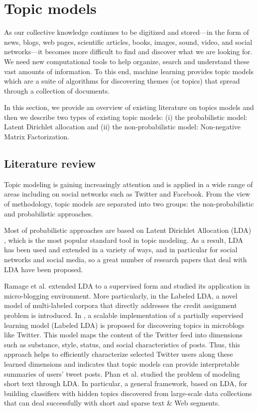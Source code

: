 \section{Topic models}

As our collective knowledge continues to be digitized and stored—in the 
form of news, blogs, web pages, scientific articles, books, images, sound,
video, and social networks—it becomes more difficult to find and discover 
what we are looking for. We need new computational tools to help organize, 
search and understand these vast amounts of information. To this end, machine learning provides topic models which are a suite of algorithms for discovering themes (or topics) that spread through a collection of documents.

In this section, we provide an overview of existing literature on topics models and then we describe two types of existing topic models: (i) the probabilistic model: Latent Dirichlet allocation and (ii) the non-probabilistic model: Non-negative Matrix Factorization.



\subsection{Literature review}

Topic modeling is gaining increasingly attention and is applied in a wide range of areas including on social networks such as Twitter and Facebook. From the view of methodology, topic models are separated into two groups: the non-probabilistic and probabilistic approaches. 


Most of probabilistic approaches are based on Latent Dirichlet Allocation (LDA) \cite{Blei}, which is the most popular standard tool in topic modeling. As a result, LDA has been used and extended in a variety of ways, and in particular 
for social networks and social media, so a great number of research papers that deal with LDA have been proposed.


Ramage et al. \cite{microblogs,Ramage} extended LDA to a supervised form and studied its application in
micro-blogging environment. More particularly, in \cite{Ramage} the Labeled LDA, a novel model of
multi-labeled corpora that directly addresses the credit assignment problem is introduced. In \cite{microblogs},
a scalable implementation of a partially supervised learning model (Labeled LDA) is proposed for 
discovering topics in microblogs like Twitter. This model maps the content of the Twitter feed 
into dimensions such as substance, style, status, and social characteristics of posts. Thus, this approach 
helps to efficiently characterize selected Twitter users along these learned dimensions and indicates that 
topic models can provide interpretable summaries of users’ tweet posts. Phan et al. \cite{Phan} studied the problem
of modeling short text through LDA. In particular, a general framework, based on LDA, for building classifiers 
with hidden topics discovered from large-scale data collections that can deal successfully with short and
sparse text \& Web segments. 

